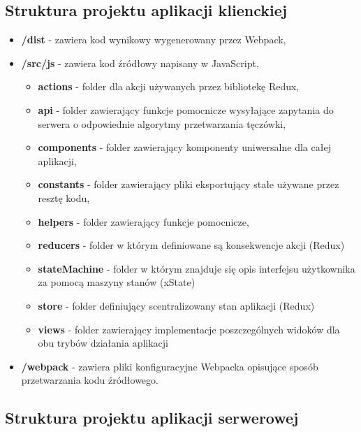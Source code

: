 \subsection{Struktura projektu aplikacji klienckiej}

\begin{itemize}
  \item \textbf{/dist} - zawiera kod wynikowy wygenerowany przez Webpack,
  \item \textbf{/src/js} - zawiera kod \'zródłowy napisany w JavaScript,
  \begin{itemize}
    \item \textbf{actions} - folder dla akcji używanych przez bibliotekę Redux,
    \item \textbf{api} - folder zawierający funkcje pomocnicze wysyłające zapytania do serwera o odpowiednie algorytmy
    przetwarzania tęczówki,
    \item \textbf{components} - folder zawierający komponenty uniwersalne dla całej aplikacji,
    \item \textbf{constants} - folder zawierający pliki eksportujący stałe używane przez resztę kodu,
    \item \textbf{helpers} - folder zawierający funkcje pomocnicze,
    \item \textbf{reducers} - folder w którym definiowane są konsekwencje akcji (Redux)
    \item \textbf{stateMachine} - folder w którym znajduje się opis interfejsu użytkownika za pomocą
    maszyny stanów (xState)
    \item \textbf{store} - folder definiujący scentralizowany stan aplikacji (Redux)
    \item \textbf{views} - folder zawierający implementacje poszczególnych widoków dla obu trybów działania aplikacji
  \end{itemize}
  \item \textbf{/webpack} - zawiera pliki konfiguracyjne Webpacka opisujące sposób przetwarzania kodu \'zródłowego.
\end{itemize}

\subsection{Struktura projektu aplikacji serwerowej}

